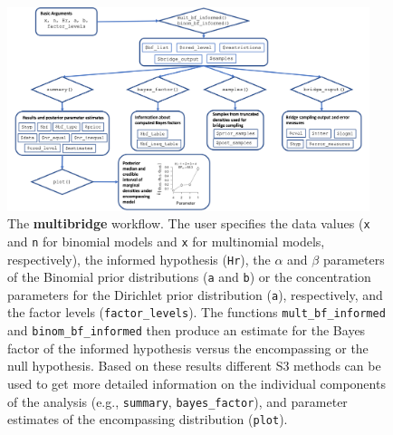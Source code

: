 \documentclass[
  english,
  man,floatsintext]{apa6}
\begin{document}
\begin{figure}
\includegraphics[width=400px]{scheme_multibridge} \caption{The \textbf{multibridge} workflow. The user specifies the data values (\texttt{x} and \texttt{n} for binomial models and \texttt{x} for multinomial models, respectively), the informed hypothesis (\texttt{Hr}), the \(\alpha\) and \(\beta\) parameters of the Binomial prior distributions (\texttt{a} and \texttt{b}) or the concentration parameters for the Dirichlet prior distribution (\texttt{a}), respectively, and the factor levels (\texttt{factor\_levels}). The functions \texttt{mult\_bf\_informed} and \texttt{binom\_bf\_informed} then produce an estimate for the Bayes factor of the informed hypothesis versus the encompassing or the null hypothesis. Based on these results different S3 methods can be used to get more detailed information on the individual components of the analysis (e.g., \texttt{summary}, \texttt{bayes\_factor}), and parameter estimates of the encompassing distribution (\texttt{plot}).}\label{fig:scheme-multibridge}
\end{figure}
\end{document}
